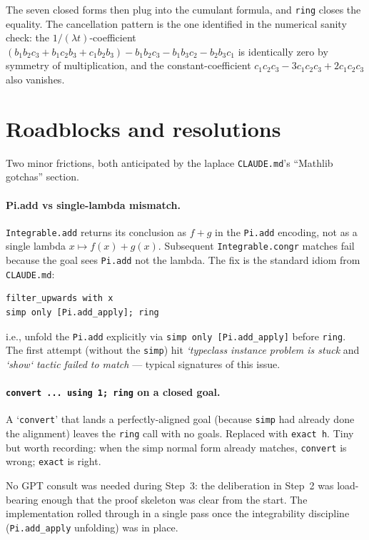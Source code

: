 \documentclass[11pt]{article}
\begin{document}
\noindent
The seven closed forms then plug into the cumulant formula, and
\texttt{ring} closes the equality. The cancellation pattern is the
one identified in the numerical sanity check:
the $1/(\lambda t)$-coefficient
$(b_1 b_2 c_3 + b_1 c_2 b_3 + c_1 b_2 b_3)
- b_1 b_2 c_3 - b_1 b_3 c_2 - b_2 b_3 c_1$
is identically zero by symmetry of multiplication, and the
constant-coefficient
$c_1 c_2 c_3 - 3 c_1 c_2 c_3 + 2 c_1 c_2 c_3$
also vanishes.

\section{Roadblocks and resolutions}

Two minor frictions, both anticipated by the laplace
\texttt{CLAUDE.md}'s ``Mathlib gotchas'' section.

\paragraph{Pi.add vs single-lambda mismatch.}
\texttt{Integrable.add} returns its conclusion as
$f + g$ in the \texttt{Pi.add} encoding, not as a single lambda
$x \mapsto f(x) + g(x)$. Subsequent \texttt{Integrable.congr} matches
fail because the goal sees \texttt{Pi.add} not the lambda. The fix
is the standard idiom from \texttt{CLAUDE.md}:
\begin{verbatim}
filter_upwards with x
simp only [Pi.add_apply]; ring
\end{verbatim}
i.e., unfold the \texttt{Pi.add} explicitly via
\texttt{simp only [Pi.add\_apply]} before \texttt{ring}.
The first attempt (without the \texttt{simp}) hit
\emph{`typeclass instance problem is stuck} and \emph{`show` tactic
failed to match} — typical signatures of this issue.

\paragraph{\texttt{convert ... using 1; ring} on a closed goal.}
A `\texttt{convert}' that lands a perfectly-aligned goal (because
\texttt{simp} had already done the alignment) leaves the
\texttt{ring} call with no goals. Replaced with \texttt{exact h}.
Tiny but worth recording: when the simp normal form already matches,
\texttt{convert} is wrong; \texttt{exact} is right.

No GPT consult was needed during Step~3: the deliberation in
Step~2 was load-bearing enough that the proof skeleton was clear
from the start. The implementation rolled through in a single pass
once the integrability discipline (\texttt{Pi.add\_apply}
unfolding) was in place.
\end{document}
